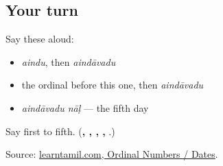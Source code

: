 \subsection*{Your turn}
Say these aloud:

\begin{itemize}
\raggedright
  \item \emph{aindu}, then \emph{aindāvadu}
  \item the ordinal before this one, then \emph{aindāvadu}
  \item \emph{aindāvadu nāḷ} — the fifth day
\end{itemize}

\begin{tcolorbox}[breakable,colback=teal!4,colframe=teal!35!black,title={Before you move on}]
Say first to fifth. (\textbf{, , , , }.)

Source: \href{https://www.learntamil.com/part1/ch02/ordinal-numbers-dates/}{learntamil.com, Ordinal Numbers / Dates}.
\end{tcolorbox}
